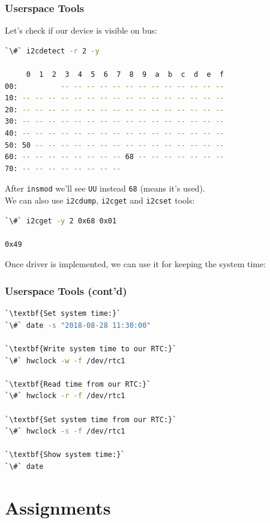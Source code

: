 \begin{frame}[containsverbatim]
  \frametitle{Userspace Tools}
  Let's check if our device is visible on bus:
  \begin{lstlisting}[language=bash]
`\#` i2cdetect -r 2 -y

     0  1  2  3  4  5  6  7  8  9  a  b  c  d  e  f
00:          -- -- -- -- -- -- -- -- -- -- -- -- --
10: -- -- -- -- -- -- -- -- -- -- -- -- -- -- -- --
20: -- -- -- -- -- -- -- -- -- -- -- -- -- -- -- --
30: -- -- -- -- -- -- -- -- -- -- -- -- -- -- -- --
40: -- -- -- -- -- -- -- -- -- -- -- -- -- -- -- --
50: 50 -- -- -- -- -- -- -- -- -- -- -- -- -- -- --
60: -- -- -- -- -- -- -- -- 68 -- -- -- -- -- -- --
70: -- -- -- -- -- -- -- --
  \end{lstlisting}

  After \texttt{insmod} we'll see \texttt{UU} instead \texttt{68}
  (means it's used).\\
  We can also use \texttt{i2cdump}, \texttt{i2cget} and \texttt{i2cset} tools:
  \begin{lstlisting}[language=bash]
`\#` i2cget -y 2 0x68 0x01

0x49
  \end{lstlisting}
  \vspace*{-2mm}
\end{frame}

\begin{frame}[containsverbatim]
  Once driver is implemented, we can use it for keeping the system time:
  \frametitle{Userspace Tools (cont'd)}
  \begin{lstlisting}[language=bash]
`\textbf{Set system time:}`
`\#` date -s "2018-08-28 11:30:00"

`\textbf{Write system time to our RTC:}`
`\#` hwclock -w -f /dev/rtc1

`\textbf{Read time from our RTC:}`
`\#` hwclock -r -f /dev/rtc1

`\textbf{Set system time from our RTC:}`
`\#` hwclock -s -f /dev/rtc1

`\textbf{Show system time:}`
`\#` date
  \end{lstlisting}
\end{frame}


\section{Assignments}

